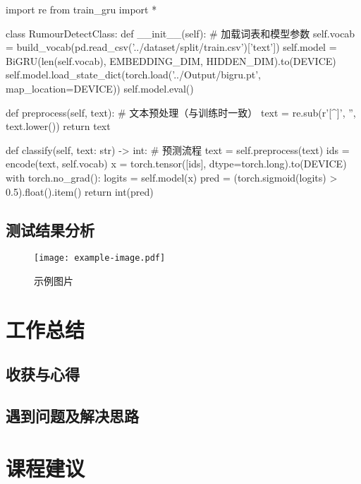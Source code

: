 \begin{codeblock}[language=Python]
import re
from train_gru import *

class RumourDetectClass:
    def __init__(self):
        # 加载词表和模型参数
        self.vocab = build_vocab(pd.read_csv('../dataset/split/train.csv')['text'])
        self.model = BiGRU(len(self.vocab), EMBEDDING_DIM, HIDDEN_DIM).to(DEVICE)
        self.model.load_state_dict(torch.load('../Output/bigru.pt', map_location=DEVICE))
        self.model.eval()

    def preprocess(self, text):
        # 文本预处理（与训练时一致）
        text = re.sub(r'[^\w\s]', '', text.lower())
        return text
    
    def classify(self, text: str) -> int:
        # 预测流程
        text = self.preprocess(text)
        ids = encode(text, self.vocab)
        x = torch.tensor([ids], dtype=torch.long).to(DEVICE)
        with torch.no_grad():
            logits = self.model(x)
            pred = (torch.sigmoid(logits) > 0.5).float().item()
        return int(pred)
\end{codeblock}


\section{测试结果分析}


\begin{figure}[ht]
  \centering
  \texttt{[image: example-image.pdf]}
  \caption{示例图片}
  \label{fig:example}
\end{figure}




\chapter{工作总结}

\section{收获与心得}



\section{遇到问题及解决思路}

\chapter{课程建议}
